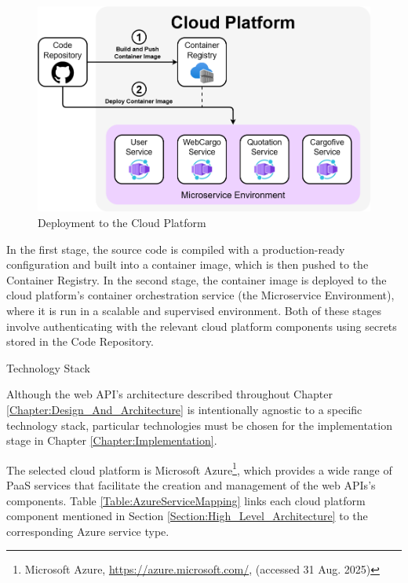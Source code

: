 \documentclass[12pt, reqno]{amsbook}
\makeatletter
\def\section{\@startsection{section}{1}%
      \z@{.5\linespacing\@plus.7\linespacing}{.25\linespacing}%
      {\normalfont\bfseries\flushleft}}
\theoremstyle{definition}
\theoremstyle{definition}
\numberwithin{section}{chapter}
\numberwithin{table}{chapter}
\numberwithin{figure}{chapter}
\makeatother
\begin{document}
\begin{figure}[H]
  \centering
  \includegraphics[width=0.9\linewidth]{images/Deployment.png}
  \caption{\label{Figure:Deployment}Deployment to the Cloud Platform}
\end{figure}

In the first stage, the source code is compiled with a production-ready configuration and built into a container image, which is then pushed to the Container Registry. In the second stage, the container image is deployed to the cloud platform's container orchestration service (the Microservice Environment), where it is run in a scalable and supervised environment. Both of these stages involve authenticating with the relevant cloud platform components using secrets stored in the Code Repository.

\section{Technology Stack}
\label{Section:Technology_Stack}

Although the web \ac{API}'s architecture described throughout Chapter \ref{Chapter:Design_And_Architecture} is intentionally agnostic to a specific technology stack, particular technologies must be chosen for the implementation stage in Chapter \ref{Chapter:Implementation}.

The selected cloud platform is Microsoft Azure\footnote{Microsoft Azure, \url{https://azure.microsoft.com/}, (accessed 31 Aug. 2025)}, which provides a wide range of \ac{PaaS} services that facilitate the creation and management of the web \acp{API}'s components. Table \ref{Table:AzureServiceMapping} links each cloud platform component mentioned in Section \ref{Section:High_Level_Architecture} to the corresponding Azure service type.
\end{document}
